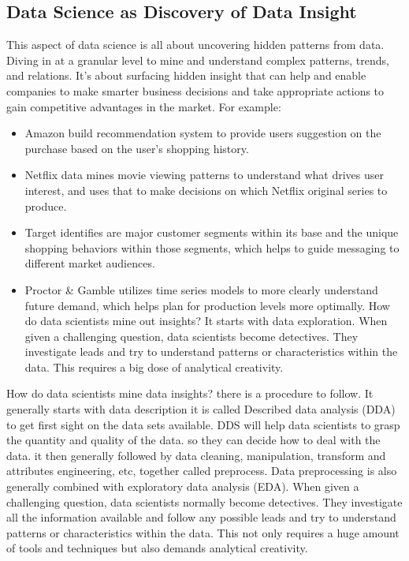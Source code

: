 \documentclass[
]{book}
\providecommand{\tightlist}{%
  \setlength{\itemsep}{0pt}\setlength{\parskip}{0pt}}
\begin{document}
\hypertarget{data-science-as-discovery-of-data-insight}{%
\subsection*{Data Science as Discovery of Data Insight}\label{data-science-as-discovery-of-data-insight}}


This aspect of data science is all about uncovering hidden patterns from data. Diving in at a granular level to mine and understand complex patterns, trends, and relations. It's about surfacing hidden insight that can help and enable companies to make smarter business decisions and take appropriate actions to gain competitive advantages in the market. For example:

\begin{itemize}
\tightlist
\item
  Amazon build recommendation system to provide users suggestion on the purchase based on the user's shopping history.
\item
  Netflix data mines movie viewing patterns to understand what drives user interest, and uses that to make decisions on which Netflix original series to produce.
\item
  Target identifies are major customer segments within its base and the unique shopping behaviors within those segments, which helps to guide messaging to different market audiences.
\item
  Proctor \& Gamble utilizes time series models to more clearly understand future demand, which helps plan for production levels more optimally.
  How do data scientists mine out insights? It starts with data exploration. When given a challenging question, data scientists become detectives. They investigate leads and try to understand patterns or characteristics within the data. This requires a big dose of analytical creativity.
\end{itemize}

How do data scientists mine data insights? there is a procedure to follow. It generally starts with data description it is called Described data analysis (DDA) to get first sight on the data sets available. DDS will help data scientists to grasp the quantity and quality of the data. so they can decide how to deal with the data. it then generally followed by data cleaning, manipulation, transform and attributes engineering, etc, together called preprocess. Data preprocessing is also generally combined with exploratory data analysis (EDA). When given a challenging question, data scientists normally become detectives. They investigate all the information available and follow any possible leads and try to understand patterns or characteristics within the data. This not only requires a huge amount of tools and techniques but also demands analytical creativity.
\end{document}
